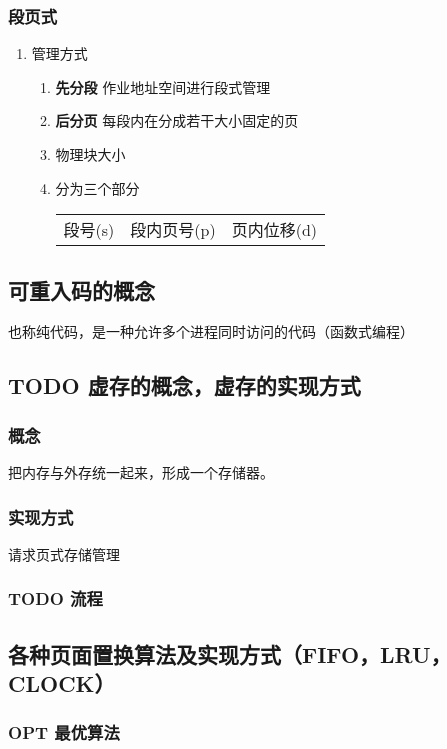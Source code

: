 \documentclass[11pt]{article}
\begin{document}
\subsubsection{段页式}
\label{sec-3-3-4}
\begin{enumerate}
\item 管理方式
\label{sec-3-3-4-1}
\begin{enumerate}
\item \textbf{先分段} 作业地址空间进行段式管理
\item \textbf{后分页} 每段内在分成若干大小固定的页
\item 物理块大小
\item 分为三个部分
\begin{center}
\begin{tabular}{lll}
段号(s) & 段内页号(p) & 页内位移(d)\\
\end{tabular}
\end{center}
\end{enumerate}
\end{enumerate}
\subsection{可重入码的概念}
\label{sec-3-4}
也称纯代码，是一种允许多个进程同时访问的代码（函数式编程）
\subsection{{\bfseries\sffamily TODO} 虚存的概念，虚存的实现方式}
\label{sec-3-5}
\subsubsection{概念}
\label{sec-3-5-1}
把内存与外存统一起来，形成一个存储器。
\subsubsection{实现方式}
\label{sec-3-5-2}
请求页式存储管理
\subsubsection{{\bfseries\sffamily TODO} 流程}
\label{sec-3-5-3}
\subsection{各种页面置换算法及实现方式（FIFO，LRU，CLOCK）}
\label{sec-3-6}
\subsubsection{OPT 最优算法}
\label{sec-3-6-1}
\end{document}
